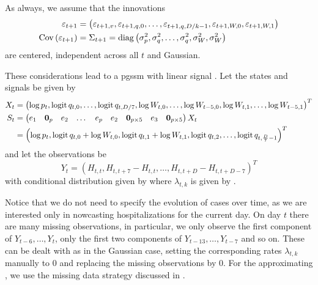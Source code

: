 As always, we assume that the innovations 
\begin{align*}
    \varepsilon_{t + 1} &= \left( \varepsilon_{t + 1, v}, \varepsilon_{t + 1, q,0}, \dots, \varepsilon_{t + 1, q, D / k - 1}, \varepsilon_{t + 1, W, 0}, \varepsilon_{t + 1, W, 1}  \right) \\
    \operatorname{Cov} \left( \varepsilon_{t + 1 } \right) &= \Sigma_{t + 1} = \operatorname{diag} \left( \sigma^{2}_p, \sigma^2_{q}, \dots, \sigma^{2}_q, \sigma^{2}_W , \sigma^{2}_{W}\right)
\end{align*} are centered, independent across all $t$ and Gaussian.

These considerations lead to a \acrshort{pgssm} with linear signal . Let the states and signals be given by 
\begin{align*}
   X_{t} &= \left( \log p_{t}, \operatorname{logit} q_{t,0}, \dots, \operatorname{logit} q_{t, D / 7}, \log W_{t, 0}, \dots, \log W_{t - 5, 0}, \log W_{t, 1}, \dots, \log W_{t - 5, 1} \right) ^{T} \\
   S_{t} &= \begin{pmatrix}
       e_{1} & \mathbf 0_{p} & e_{2} & \dots & e_{p} & e_{2} & \mathbf 0_{p \times 5} & e_{3} & \mathbf 0_{p \times 5}
   \end{pmatrix} X_{t} \\
   & = \left( \log p_{t}, \operatorname{logit} q_{t,0} + \log W_{t, 0}, \operatorname{logit} q_{t, 1} + \log W_{t, 1}, \operatorname{logit} q_{t, 2}, \dots, \operatorname{logit} q_{t, \frac{D}{7} - 1} \right)^{T}
\end{align*}
and let the observations be 
$$
    Y_{t} = \left( H_{t,t},  H_{t, t + 7} - H^{}_{t, t} , \dots, H_{t, t + D} - H^{}_{t, t + D - 7}\right)^{T}
$$
with conditional distribution given by  where $\lambda_{t,k}$ is given by .

Notice that we do not need to specify the evolution of cases over time, as we are interested only in nowcasting hospitalizations for the current day. 
On day $t$ there are many missing observations, in particular, we only observe the first component of $Y_{t - 6}, \dots, Y_{t}$, only the first two components of $Y_{t - 13}, \dots, Y_{t-7}$ and so on. These can be dealt with as in the Gaussian case, setting the corresponding rates $\lambda_{t,k}$ manually to $0$ and replacing the missing observations by $0$. For the approximating , we use the missing data strategy discussed in  .

